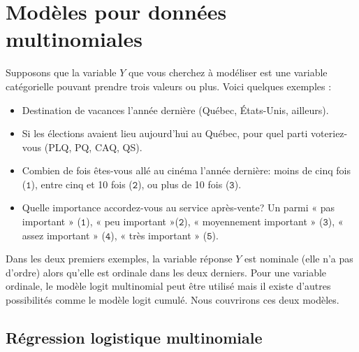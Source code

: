 \documentclass[
  11pt,
  letterpaper,
]{scrbook}
\providecommand{\tightlist}{%
  \setlength{\itemsep}{0pt}\setlength{\parskip}{0pt}}\usepackage{longtable,booktabs,array}
\theoremstyle{definition}
\theoremstyle{remark}
\begin{document}
\hypertarget{moduxe8les-pour-donnuxe9es-multinomiales}{%
\section{Modèles pour données
multinomiales}\label{moduxe8les-pour-donnuxe9es-multinomiales}}

Supposons que la variable \(Y\) que vous cherchez à modéliser est une
variable catégorielle pouvant prendre trois valeurs ou plus. Voici
quelques exemples :

\begin{itemize}
\tightlist
\item
  Destination de vacances l'année dernière (Québec, États-Unis,
  ailleurs).
\item
  Si les élections avaient lieu aujourd'hui au Québec, pour quel parti
  voteriez-vous (PLQ, PQ, CAQ, QS).
\item
  Combien de fois êtes-vous allé au cinéma l'année dernière: moins de
  cinq fois (\(\texttt{1}\)), entre cinq et 10 fois (\(\texttt{2}\)), ou
  plus de 10 fois (\(\texttt{3}\)).
\item
  Quelle importance accordez-vous au service après-vente? Un parmi « pas
  important » (\(\texttt{1}\)), « peu important »(\(\texttt{2}\)), «
  moyennement important » (\(\texttt{3}\)), « assez important »
  (\(\texttt{4}\)), « très important » (\(\texttt{5}\)).
\end{itemize}

Dans les deux premiers exemples, la variable réponse \(Y\) est nominale
(elle n'a pas d'ordre) alors qu'elle est ordinale dans les deux
derniers. Pour une variable ordinale, le modèle logit multinomial peut
être utilisé mais il existe d'autres possibilités comme le modèle logit
cumulé. Nous couvrirons ces deux modèles.

\hypertarget{ruxe9gression-logistique-multinomiale}{%
\subsection{Régression logistique
multinomiale}\label{ruxe9gression-logistique-multinomiale}}
\end{document}
